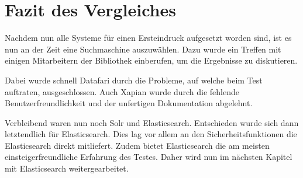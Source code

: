 
\chapter{Fazit des Vergleiches}

Nachdem nun alle Systeme für einen Ersteindruck aufgesetzt worden sind, ist es nun an der Zeit eine Suchmaschine auszuwählen. Dazu wurde ein Treffen mit einigen Mitarbeitern der Bibliothek einberufen, um die Ergebnisse zu diskutieren. 

Dabei wurde schnell Datafari durch die Probleme, auf welche beim Test auftraten, ausgeschlossen. Auch Xapian wurde durch die fehlende Benutzerfreundlichkeit und der unfertigen Dokumentation abgelehnt. 


Verbleibend waren nun noch Solr und Elasticsearch. Entschieden wurde sich dann letztendlich für Elasticsearch. Dies lag vor allem an den Sicherheitsfunktionen die Elasticsearch direkt mitliefert. Zudem bietet Elasticsearch die am meisten einsteigerfreundliche Erfahrung des Testes. Daher wird nun im nächsten Kapitel mit Elasticsearch weitergearbeitet.